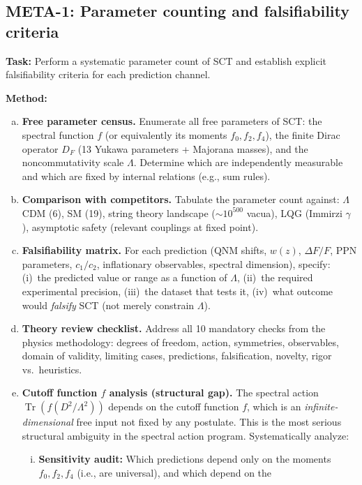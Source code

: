 \documentclass[12pt,a4paper]{article}
\newcommand{\Tr}{\operatorname{Tr}}
\newcommand{\task}[1]{\noindent\textbf{Task:} #1\par}
\newcommand{\method}[1]{\noindent\textbf{Method:} #1\par}
\begin{document}
\subsection{META-1: Parameter counting and falsifiability criteria}
\label{task:META1}

\task{Perform a systematic parameter count of SCT and establish explicit
falsifiability criteria for each prediction channel.}

\method{
\begin{enumerate}[(a)]
  \item \textbf{Free parameter census.} Enumerate all free parameters of SCT:
    the spectral function $f$ (or equivalently its moments $f_0, f_2, f_4$),
    the finite Dirac operator $D_F$ (13 Yukawa parameters + Majorana masses),
    and the noncommutativity scale $\Lambda$. Determine which are independently
    measurable and which are fixed by internal relations (e.g., sum rules).
  \item \textbf{Comparison with competitors.} Tabulate the parameter count
    against: $\Lambda$CDM (6), SM (19), string theory landscape ($\sim 10^{500}$
    vacua), LQG (Immirzi $\gamma$), asymptotic safety (relevant couplings at
    fixed point).
  \item \textbf{Falsifiability matrix.} For each prediction
    (QNM shifts, $w(z)$, $\Delta F/F$, PPN parameters, $c_1/c_2$,
    inflationary observables, spectral dimension), specify:
    (i)~the predicted value or range as a function of $\Lambda$,
    (ii)~the required experimental precision,
    (iii)~the dataset that tests it,
    (iv)~what outcome would \emph{falsify} SCT (not merely constrain $\Lambda$).
  \item \textbf{Theory review checklist.} Address all 10 mandatory checks
    from the physics methodology: degrees of freedom, action, symmetries,
    observables, domain of validity, limiting cases, predictions, falsification,
    novelty, rigor vs.\ heuristics.
  \item \textbf{Cutoff function $f$ analysis (structural gap).}
    The spectral action $\Tr(f(D^2/\Lambda^2))$ depends on the cutoff function
    $f$, which is an \emph{infinite-dimensional} free input not fixed by any
    postulate. This is the most serious structural ambiguity in the spectral
    action program. Systematically analyze:
    \begin{enumerate}[(i)]
      \item \textbf{Sensitivity audit:} Which predictions depend only on the
        moments $f_0, f_2, f_4$ (i.e., are universal), and which depend on the

\end{enumerate}
\end{enumerate}}
\end{document}
